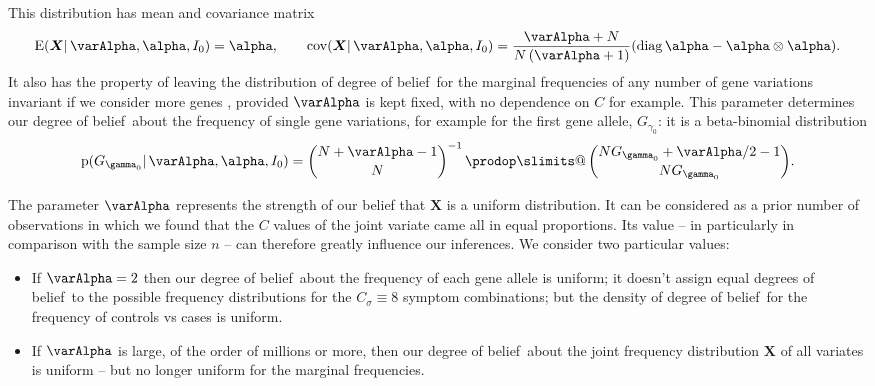 \documentclass[\ifafour a4paper,12pt,\else a5paper,10pt,\fi%
onecolumn,oneside,article,%
british%
]{memoir}
\makeatletter
\theoremstyle{remark}
\theoremstyle{innote}
\def\sum{\DOTSI\sumop\slimits@}
\def\prod{\DOTSI\prodop\slimits@}
\newcommand*{\citep}{\parencites}
\newcommand*{\delt}{\deltaup}%
\newcommand*{\di}{\mathrm{d}}%
\newcommand*{\pf}{\mathrm{p}}%
\renewcommand*{\|}{\mathpunct{|}}
\newcommand*{\sects}{\S\S}%
\newcommand*{\tprod}{\mathop{\textstyle\prod}\nolimits}
\newcommand*{\tsum}{\mathop{\textstyle\sum}\nolimits}
\newcommand*{\E}{\mathrm{E}}
\DeclareMathOperator{\cov}{cov}
\DeclareMathOperator{\diag}{diag}
\newcommand*{\dob}{degree of belief}
\newcommand*{\dobs}{degrees of belief}
\newcommand*{\ysum}{\tsum}
\newcommand*{\yprod}{\tprod}
\newcommand*{\yg}{\gamma}
\newcommand*{\yFs}{\bm{S}}
\newcommand*{\yF}{\bm{X}}
\newcommand*{\yCs}{C_{\sigma}}
\newcommand*{\yIo}{I_{0}}
\newcommand*{\yA}{\varAlpha}
\newcommand*{\ya}{\bm{\alpha}}
\makeatother
\begin{document}
This distribution has mean and covariance matrix
\begin{equation}\label{eq:pre_NO-mean_covariance_dirichlet}
  \E(\yF \| \yA, \ya,\yIo) = \ya, \qquad
  \cov(\yF \| \yA, \ya,\yIo) =
  \frac{\yA+N}{N\,(\yA+1)}(\diag\ya -\ya\otimes\ya).
\end{equation}
It also has the property of leaving the distribution of \dob\ for the
marginal frequencies of any number of gene variations invariant if we
consider more genes \citep[\sects~3--4]{basuetal1982}, provided $\yA$ is
kept fixed, with no dependence on $C$ for example. This parameter
determines our \dob\ about the frequency of single gene variations, for
example for the first gene allele, $G_{\yg_0}$: it is a beta-binomial
distribution
\begin{equation}
  \label{eq:pre_NO-dirichlet_prior_marginal_beta-binomial}
  \pf(G_{\yg_0} \| \yA, \ya,\yIo) =
  \binom{N+\yA-1}{N}^{-1} \yprod\binom{N G_{\yg_0}+\yA/2-1}{N G_{\yg_0}}.
\end{equation}

The parameter $\yA$ represents the strength of our belief that $\yF$ is a
uniform distribution. It can be considered as a prior number of
observations in which we found that the $C$ values of the joint variate
came all in equal proportions. Its value -- in particularly in comparison
with the sample size $n$ -- can therefore greatly influence
our inferences. We consider two particular values:
\begin{itemize}[label=--]
\item If $\yA=2$ then our \dob\ about the frequency of each gene allele is
  uniform; it doesn't assign equal \dobs\ to the possible frequency
  distributions for the $\yCs\equiv 8$ symptom combinations; %
  but the density of \dob\ for the frequency of controls vs cases is
  uniform.
\item If $\yA$ is large, of the order of millions or more, then our \dob\
  about the joint frequency distribution $\yF$ of all variates is uniform
  -- but no longer uniform for the marginal frequencies.
\end{itemize}
\end{document}

